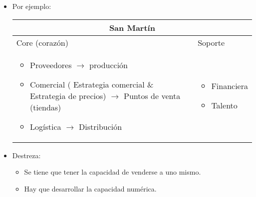 \begin{itemize}
    \item Por ejemplo:
        \begin{center}
           \begin{tabular}{ | p{6cm} | p{6cm} | }
               \hline
                    \multicolumn{2}{|c|}{San Martín} \\
               \hline
                    Core (corazón) & Soporte \\ 
               \hline
                    \begin{itemize}
                        \item Proveedores $\rightarrow$ producción 
                        \item Comercial ( Estrategia comercial \& Estrategia de precios) $\rightarrow$ Puntos de venta (tiendas)
                        \item Logística $\rightarrow$ Distribución
                    \end{itemize} &
                    \begin{itemize}
                        \item Financiera 
                        \item Talento 
                    \end{itemize} \\ 
                \hline
           \end{tabular}
        \end{center}
    
    \item Destreza:
        \begin{itemize}[label=\#]
            \item Se tiene que tener la capacidad de venderse a uno mismo.
            \item Hay que desarrollar la capacidad numérica.
        \end{itemize}
\end{itemize}




